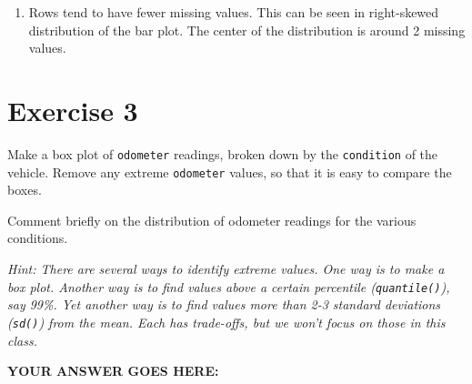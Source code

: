 \documentclass[
]{article}
\newenvironment{Shaded}{\begin{snugshade}}{\end{snugshade}}
\newcommand{\CommentTok}[1]{\textcolor[rgb]{0.56,0.35,0.01}{\textit{#1}}}
\newcommand{\DataTypeTok}[1]{\textcolor[rgb]{0.13,0.29,0.53}{#1}}
\newcommand{\DecValTok}[1]{\textcolor[rgb]{0.00,0.00,0.81}{#1}}
\newcommand{\FloatTok}[1]{\textcolor[rgb]{0.00,0.00,0.81}{#1}}
\newcommand{\KeywordTok}[1]{\textcolor[rgb]{0.13,0.29,0.53}{\textbf{#1}}}
\newcommand{\NormalTok}[1]{#1}
\newcommand{\OperatorTok}[1]{\textcolor[rgb]{0.81,0.36,0.00}{\textbf{#1}}}
\newcommand{\OtherTok}[1]{\textcolor[rgb]{0.56,0.35,0.01}{#1}}
\newcommand{\StringTok}[1]{\textcolor[rgb]{0.31,0.60,0.02}{#1}}
\providecommand{\tightlist}{%
  \setlength{\itemsep}{0pt}\setlength{\parskip}{0pt}}
\begin{document}
\begin{enumerate}
\def\labelenumi{\arabic{enumi}.}
\setcounter{enumi}{2}
\tightlist
\item
  Rows tend to have fewer missing values. This can be seen in
  right-skewed distribution of the bar plot. The center of the
  distribution is around 2 missing values.
\end{enumerate}

\hypertarget{exercise-3}{%
\section{Exercise 3}\label{exercise-3}}

Make a box plot of \texttt{odometer} readings, broken down by the
\texttt{condition} of the vehicle. Remove any extreme \texttt{odometer}
values, so that it is easy to compare the boxes.

Comment briefly on the distribution of odometer readings for the various
conditions.

\emph{Hint: There are several ways to identify extreme values. One way
is to make a box plot. Another way is to find values above a certain
percentile (\texttt{quantile()}), say 99\%. Yet another way is to find
values more than 2-3 standard deviations (\texttt{sd()}) from the mean.
Each has trade-offs, but we won't focus on those in this class.}

\textbf{YOUR ANSWER GOES HERE:}

\begin{Shaded}
\end{Shaded}
\end{document}
